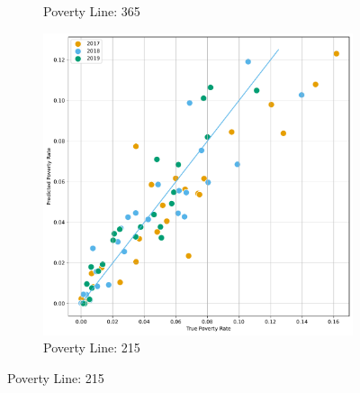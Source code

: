 \begin{figure}[H]
\begin{subfigure}[b]{0.47\textwidth}
            \caption{Poverty Line: 365}
        \end{subfigure} 
        \hfill
        \begin{subfigure}[b]{0.47\textwidth}
            \centering
            \includegraphics[width=\textwidth]{../figures/baseline_report/fig4_2_prediction_vs_true_poverty_rate_regions_p215_scatter.pdf}
            \caption{Poverty Line: 215}
        \end{subfigure} 
\end{figure}

    

